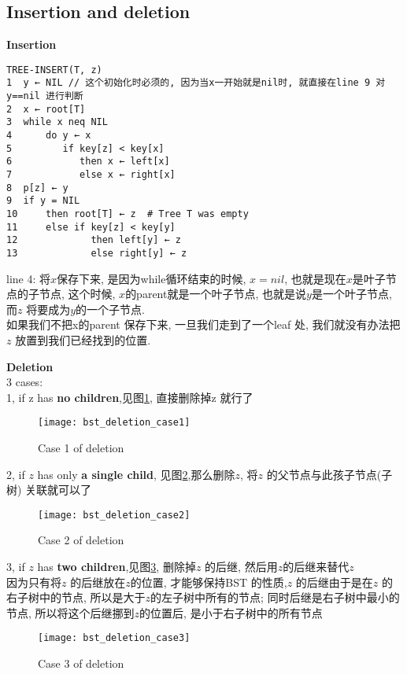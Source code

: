 \documentclass{article}
\begin{document}
\subsection{Insertion and deletion}
\textbf{Insertion}\\
\begin{verbatim}
TREE-INSERT(T, z)
1  y ← NIL // 这个初始化时必须的, 因为当x一开始就是nil时, 就直接在line 9 对y==nil 进行判断
2  x ← root[T]
3  while x neq NIL
4      do y ← x
5         if key[z] < key[x]
6            then x ← left[x]
7            else x ← right[x]
8  p[z] ← y
9  if y = NIL
10     then root[T] ← z  # Tree T was empty
11     else if key[z] < key[y]
12             then left[y] ← z
13             else right[y] ← z
\end{verbatim}

\noindent line 4: 将$x$保存下来, 是因为while循环结束的时候, $x=nil$, 也就是现在$x$是叶子节点的子节点, 这个时候, $x$的parent就是一个叶子节点, 也就是说$y$是一个叶子节点, 而$z$ 将要成为$y$的一个子节点.\\
如果我们不把x的parent 保存下来, 一旦我们走到了一个leaf 处, 我们就没有办法把$z$ 放置到我们已经找到的位置.

\bigskip
\textbf{Deletion}\\
3 cases:\\
1, if z has \textbf{no children},见图\ref{fig.bst.deletion.case.1}, 直接删除掉z 就行了

\begin{figure}[htbp]
  \centering
  \texttt{[image: bst\_deletion\_case1]}\\
  \caption{Case 1 of deletion}\label{fig.bst.deletion.case.1}
\end{figure}

2, if $z$ has only \textbf{a single child}, 见图\ref{fig.bst.deletion.case.2},那么删除$z$, 将$z$ 的父节点与此孩子节点(子树) 关联就可以了
\begin{figure}[htbp]
  \centering
  \texttt{[image: bst\_deletion\_case2]}\\
  \caption{Case 2 of deletion}\label{fig.bst.deletion.case.2}
\end{figure}

3, if $z$ has \textbf{two children},见图\ref{fig.bst.deletion.case.3}, 删除掉$z$ 的后继, 然后用$z$的后继来替代$z$\\
因为只有将$z$ 的后继放在$z$的位置, 才能够保持BST 的性质,$z$ 的后继由于是在$z$ 的右子树中的节点, 所以是大于$z$的左子树中所有的节点; 同时后继是右子树中最小的节点, 所以将这个后继挪到$z$的位置后, 是小于右子树中的所有节点\\
\begin{figure}[htbp]
  \centering
  \texttt{[image: bst\_deletion\_case3]}\\
  \caption{Case 3 of deletion}\label{fig.bst.deletion.case.3}
\end{figure}
\end{document}
